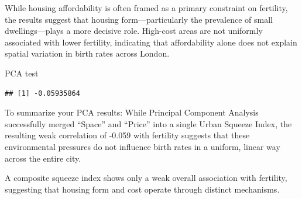 \documentclass[
]{article}
\newenvironment{Shaded}{\begin{snugshade}}{\end{snugshade}}
\newcommand{\AttributeTok}[1]{\textcolor[rgb]{0.13,0.29,0.53}{#1}}
\newcommand{\CommentTok}[1]{\textcolor[rgb]{0.56,0.35,0.01}{\textit{#1}}}
\newcommand{\ConstantTok}[1]{\textcolor[rgb]{0.56,0.35,0.01}{#1}}
\newcommand{\DecValTok}[1]{\textcolor[rgb]{0.00,0.00,0.81}{#1}}
\newcommand{\FunctionTok}[1]{\textcolor[rgb]{0.13,0.29,0.53}{\textbf{#1}}}
\newcommand{\NormalTok}[1]{#1}
\newcommand{\OtherTok}[1]{\textcolor[rgb]{0.56,0.35,0.01}{#1}}
\newcommand{\SpecialCharTok}[1]{\textcolor[rgb]{0.81,0.36,0.00}{\textbf{#1}}}
\begin{document}
While housing affordability is often framed as a primary constraint on
fertility, the results suggest that housing form---particularly the
prevalence of small dwellings---plays a more decisive role. High-cost
areas are not uniformly associated with lower fertility, indicating that
affordability alone does not explain spatial variation in birth rates
across London.

PCA test

\begin{Shaded}
\end{Shaded}

\begin{verbatim}
## [1] -0.05935864
\end{verbatim}

To summarize your PCA results: While Principal Component Analysis
successfully merged ``Space'' and ``Price'' into a single Urban Squeeze
Index, the resulting weak correlation of -0.059 with fertility suggests
that these environmental pressures do not influence birth rates in a
uniform, linear way across the entire city.

A composite squeeze index shows only a weak overall association with
fertility, suggesting that housing form and cost operate through
distinct mechanisms.
\end{document}
